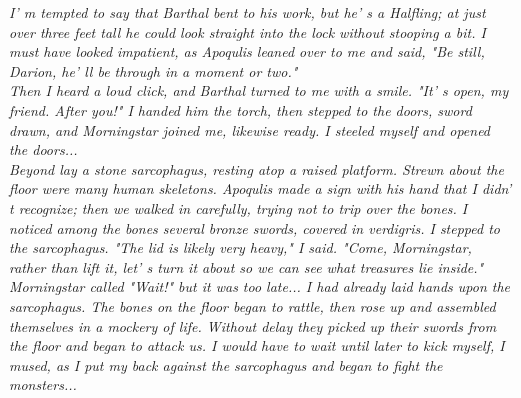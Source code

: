 \documentclass[a4paper,twoside,openany,10pt]{book}
\begin{document}
\textit{I' m tempted to say that Barthal bent to his work, but he' s a Halfling; at just over three feet tall he could look straight into the lock without stooping a bit. I must have looked impatient, as Apoqulis leaned over to me and said, "Be still, Darion, he' ll be through in a moment or two."}\\

\textit{Then I heard a loud click, and Barthal turned to me with a smile. "It' s open, my friend. After you!" I handed him the torch, then stepped to the doors, sword drawn, and Morningstar joined me, likewise ready. I steeled myself and opened the doors...}\\

\textit{Beyond lay a stone sarcophagus, resting atop a raised platform. Strewn about the floor were many human skeletons. Apoqulis made a sign with his hand that I didn' t recognize; then we walked in carefully, trying not to trip over the bones. I noticed among the bones several bronze swords, covered in verdigris. I stepped to the sarcophagus. "The lid is likely very heavy," I said. "Come, Morningstar, rather than lift it, let' s turn it about so we can see what treasures lie inside."}\\

\textit{Morningstar called "Wait!" but it was too late... I had already laid hands upon the sarcophagus. The bones on the floor began to rattle, then rose up and assembled themselves in a mockery of life. Without delay they picked up their swords from the floor and began to attack us. I would have to wait until later to kick myself, I mused, as I put my back against the sarcophagus and began to fight the monsters...}\\
\end{document}
